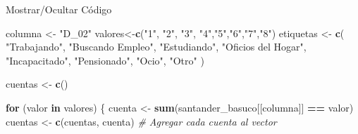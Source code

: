 \documentclass[
]{article}
\newenvironment{Shaded}{\begin{snugshade}}{\end{snugshade}}
\newcommand{\CommentTok}[1]{\textcolor[rgb]{0.56,0.35,0.01}{\textit{#1}}}
\newcommand{\ControlFlowTok}[1]{\textcolor[rgb]{0.13,0.29,0.53}{\textbf{#1}}}
\newcommand{\FunctionTok}[1]{\textcolor[rgb]{0.13,0.29,0.53}{\textbf{#1}}}
\newcommand{\NormalTok}[1]{#1}
\newcommand{\OtherTok}[1]{\textcolor[rgb]{0.56,0.35,0.01}{#1}}
\newcommand{\SpecialCharTok}[1]{\textcolor[rgb]{0.81,0.36,0.00}{\textbf{#1}}}
\newcommand{\StringTok}[1]{\textcolor[rgb]{0.31,0.60,0.02}{#1}}
\begin{document}
Mostrar/Ocultar Código

\begin{Shaded}
\begin{Highlighting}[]
\NormalTok{columna }\OtherTok{\textless{}{-}} \StringTok{"D\_02"}
\NormalTok{valores}\OtherTok{\textless{}{-}}\FunctionTok{c}\NormalTok{(}\StringTok{"1"}\NormalTok{, }\StringTok{"2"}\NormalTok{, }\StringTok{"3"}\NormalTok{, }\StringTok{"4"}\NormalTok{,}\StringTok{"5"}\NormalTok{,}\StringTok{"6"}\NormalTok{,}\StringTok{"7"}\NormalTok{,}\StringTok{"8"}\NormalTok{)}
\NormalTok{etiquetas }\OtherTok{\textless{}{-}} \FunctionTok{c}\NormalTok{(}
  \StringTok{"Trabajando"}\NormalTok{,}
  \StringTok{"Buscando Empleo"}\NormalTok{,}
  \StringTok{"Estudiando"}\NormalTok{,}
  \StringTok{"Oficios del Hogar"}\NormalTok{,}
  \StringTok{"Incapacitado"}\NormalTok{,}
  \StringTok{"Pensionado"}\NormalTok{,}
  \StringTok{"Ocio"}\NormalTok{,}
  \StringTok{"Otro"}
\NormalTok{)}

\NormalTok{cuentas }\OtherTok{\textless{}{-}} \FunctionTok{c}\NormalTok{()}

\ControlFlowTok{for}\NormalTok{ (valor }\ControlFlowTok{in}\NormalTok{ valores) \{}
\NormalTok{  cuenta }\OtherTok{\textless{}{-}} \FunctionTok{sum}\NormalTok{(santander\_basuco[[columna]] }\SpecialCharTok{==}\NormalTok{ valor)}
\NormalTok{  cuentas }\OtherTok{\textless{}{-}} \FunctionTok{c}\NormalTok{(cuentas, cuenta)  }\CommentTok{\# Agregar cada cuenta al vector}
  

\end{Highlighting}
\end{Shaded}
\end{document}
